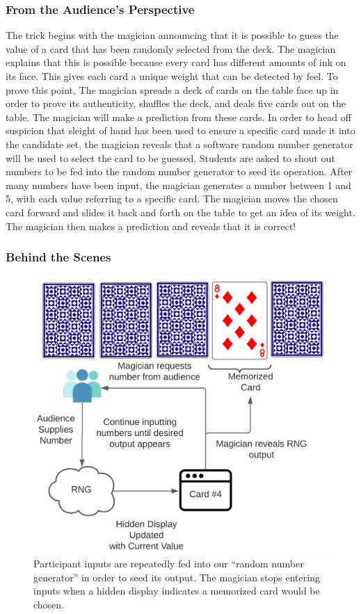 \subsubsection{From the Audience's Perspective}

The trick begins with the magician announcing that it is possible to
guess the value of a card that
has been randomly selected from the deck.
The magician
explains that this is possible because every
card has different amounts of ink on its face.
This gives each card
a unique
weight that can be detected by feel.
To prove this point,
The magician spreads a deck of cards on the table face up
in order to prove its authenticity,
shuffles the deck,
and deals five cards out on the table.
The magician will make a prediction from these cards.
In order to head off suspicion that sleight of hand has been used to ensure
a specific card made it into the candidate set, the magician reveals that
a software random number generator will be used to select the card to be
guessed.
Students are asked to shout out numbers to be fed into the random number
generator to seed its operation.  After many numbers have been input, the
magician generates a number between 1 and 5, with each value referring to a
specific card.  The magician moves the chosen card forward and slides it back
and forth on the table to get an idea of its weight.  The magician then makes
a prediction and reveals that it is correct!

\subsubsection{Behind the Scenes}

\begin{figure}[H]
\centering
\includegraphics[scale=.6]{images/Trick3}
\caption{Participant inputs are repeatedly fed into our ``random number
generator'' in order to seed its output.  The magician stops entering inputs
when a hidden display indicates a memorized card would be chosen.}
\label{fig:trick3}
\end{figure}

